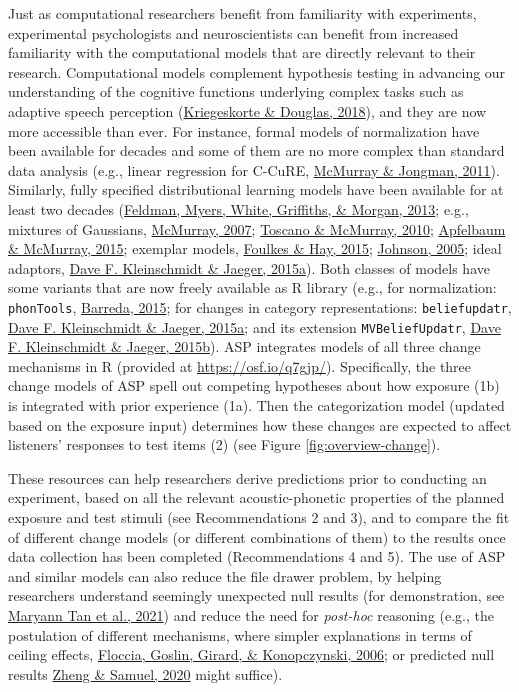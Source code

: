 \documentclass[
  11pt,
  english,
  man,floatsintext]{apa6}
\begin{document}
Just as computational researchers benefit from familiarity with experiments, experimental psychologists and neuroscientists can benefit from increased familiarity with the computational models that are directly relevant to their research. Computational models complement hypothesis testing in advancing our understanding of the cognitive functions underlying complex tasks such as adaptive speech perception (\protect\hyperlink{ref-kriegeskorte2018}{Kriegeskorte \& Douglas, 2018}), and they are now more accessible than ever. For instance, formal models of normalization have been available for decades and some of them are no more complex than standard data analysis (e.g., linear regression for C-CuRE, \protect\hyperlink{ref-mcmurray-jongman2011}{McMurray \& Jongman, 2011}). Similarly, fully specified distributional learning models have been available for at least two decades (\protect\hyperlink{ref-feldman2013}{Feldman, Myers, White, Griffiths, \& Morgan, 2013}; e.g., mixtures of Gaussians, \protect\hyperlink{ref-mcmurray2007}{McMurray, 2007}; \protect\hyperlink{ref-toscano-mcmurray2010}{Toscano \& McMurray, 2010}; \protect\hyperlink{ref-apfelbaum-mcmurray2015}{Apfelbaum \& McMurray, 2015}; exemplar models, \protect\hyperlink{ref-foulkes-hay2015}{Foulkes \& Hay, 2015}; \protect\hyperlink{ref-johnson2005}{Johnson, 2005}; ideal adaptors, \protect\hyperlink{ref-kleinschmidt-jaeger2015}{Dave F. Kleinschmidt \& Jaeger, 2015a}). Both classes of models have some variants that are now freely available as R library (e.g., for normalization: \texttt{phonTools}, \protect\hyperlink{ref-barreda2015}{Barreda, 2015}; for changes in category representations: \texttt{beliefupdatr}, \protect\hyperlink{ref-kleinschmidt-jaeger2015}{Dave F. Kleinschmidt \& Jaeger, 2015a}; and its extension \texttt{MVBeliefUpdatr}, \protect\hyperlink{ref-R-MVBeliefUpdatr}{Dave F. Kleinschmidt \& Jaeger, 2015b}). ASP integrates models of all three change mechanisms in R (provided at \url{https://osf.io/q7gjp/}). Specifically, the three change models of ASP spell out competing hypotheses about how exposure (1b) is integrated with prior experience (1a). Then the categorization model (updated based on the exposure input) determines how these changes are expected to affect listeners' responses to test items (2) (see Figure \ref{fig:overview-change}).

These resources can help researchers derive predictions prior to conducting an experiment, based on all the relevant acoustic-phonetic properties of the planned exposure and test stimuli (see Recommendations 2 and 3), and to compare the fit of different change models (or different combinations of them) to the results once data collection has been completed (Recommendations 4 and 5). The use of ASP and similar models can also reduce the file drawer problem, by helping researchers understand seemingly unexpected null results (for demonstration, see \protect\hyperlink{ref-tan2021}{Maryann Tan et al., 2021}) and reduce the need for \emph{post-hoc} reasoning (e.g., the postulation of different mechanisms, where simpler explanations in terms of ceiling effects, \protect\hyperlink{ref-floccia2006}{Floccia, Goslin, Girard, \& Konopczynski, 2006}; or predicted null results \protect\hyperlink{ref-zheng-samuel2020}{Zheng \& Samuel, 2020} might suffice).
\end{document}
